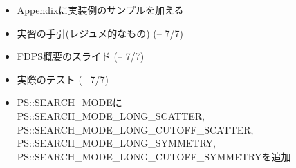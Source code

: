 \begin{itemize}

\item Appendixに実装例のサンプルを加える

\item 実習の手引(レジュメ的なもの) (-- 7/7)

\item FDPS概要のスライド (-- 7/7)

\item 実際のテスト (-- 7/7)

\item PS::SEARCH\_MODEに\\
  PS::SEARCH\_MODE\_LONG\_SCATTER, \\
  PS::SEARCH\_MODE\_LONG\_CUTOFF\_SCATTER, \\
  PS::SEARCH\_MODE\_LONG\_SYMMETRY, \\
  PS::SEARCH\_MODE\_LONG\_CUTOFF\_SYMMETRYを追加

\end{itemize}
